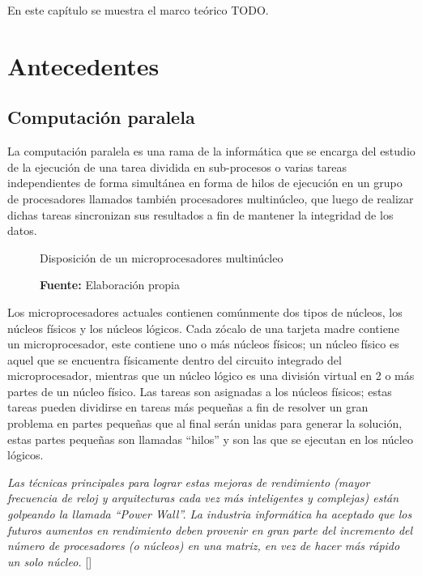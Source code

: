 \documentclass[../main/main.tex]{subfiles}
\begin{document}
\espacio

  En este capítulo se muestra el marco teórico TODO.

  \section{Antecedentes}

  \subsection{Computación paralela}

  La computación paralela es una rama de la informática que se encarga del estudio de la ejecución de una tarea dividida en sub-procesos o varias tareas independientes de forma simultánea en forma de hilos de ejecución en un grupo de procesadores llamados también procesadores multinúcleo, que luego de realizar dichas tareas sincronizan sus resultados a fin de mantener la integridad de los datos.

  \begin{figure}[H]
    \centering
    \caption{Disposición de un microprocesadores multinúcleo}
    
    \caption*{\textbf{Fuente:} Elaboración propia}
  \end{figure}

  Los microprocesadores actuales contienen comúnmente dos tipos de núcleos, los núcleos físicos y los núcleos lógicos. Cada zócalo de una tarjeta madre contiene un microprocesador, este contiene uno o más núcleos físicos; un núcleo físico es aquel que se encuentra físicamente dentro del circuito integrado del microprocesador, mientras que un núcleo lógico es una división virtual en 2 o más partes de un núcleo físico. Las tareas son asignadas a los núcleos físicos; estas tareas pueden dividirse en tareas más pequeñas a fin de resolver un gran problema en partes pequeñas que al final serán unidas para generar la solución, estas partes pequeñas son llamadas ``hilos'' y son las que se ejecutan en los núcleo lógicos.

  \textit{Las técnicas principales para lograr estas mejoras de rendimiento (mayor frecuencia de reloj y arquitecturas cada vez más inteligentes y complejas) están golpeando la llamada ``Power Wall''. La industria informática ha aceptado que los futuros aumentos en rendimiento deben provenir en gran parte del incremento del número de procesadores (o núcleos) en una matriz, en vez de hacer más rápido un solo núcleo.} [\cite[p.~6]{report:parallel_computing_illinois}]
\end{document}
